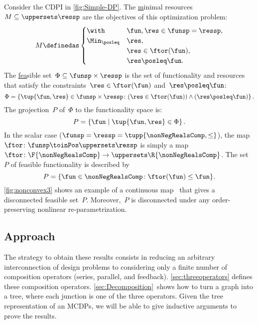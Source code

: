 \begin{example}
    \label{exa:one}
    Consider the CDPI in \cref{fig:Simple-DP}.
    The \uline{m}inimal resources~$M\subseteq\uppersets \ressp$ are the objectives of this optimization problem:
    \begin{equation*}
        M\definedas\begin{cases}
                       \with & \fun,\res\in\funsp=\ressp,\\
                       \Min_{\posleq} & \res,\\
                       & \res\in\ftor(\fun),\\
                       & \res\posleq\fun.
        \end{cases}
    \end{equation*}
    The \uline{fea}sible %
    set~$\Phi\subseteq\funsp\times\ressp$ is
    the set of functionality and resources that satisfy the constraints~$\res\in\ftor(\fun)$
    and~$\res\posleq\fun$:
    \begin{equation}
        \Phi=\left\{ \tup{\fun,\res}\in\funsp\times\ressp\colon (\res\in\ftor(\fun))\wedge(\res\posleq\fun)\right\} .\label{eq:feasible}
    \end{equation}
    The \uline{p}rojection~$P$ of~$\Phi$ to the functionality space
    is:
    \begin{equation*}
        P=\left\{ \fun\mid\tup{\fun,\res} \in\Phi\right\}.
    \end{equation*}
    In the scalar case ($\funsp=\ressp=\tupp{\nonNegRealsComp,\leq}$),
    the map~$\ftor\colon\funsp\toinPos\uppersets \ressp$ is simply a map~$\ftor\colon\F{\nonNegRealsComp}\to \uppersets\R{\nonNegRealsComp}$.
    The set~$P$ of feasible functionality is described by
    \begin{equation}
        P=\{\fun\in\nonNegRealsComp\colon \ftor(\fun)\leq\fun\}.\label{eq:Pfeasible}
    \end{equation}
    \cref{fig:nonconvex3} shows an example of a continuous map~\ftor
    that gives a disconnected feasible set~$P$. Moreover,~$P$ is disconnected
    under any order-preserving nonlinear re-parametrization.

\end{example}

\subsection{Approach}

The strategy to obtain these results  consists in reducing an arbitrary
interconnection of design problems to considering only a finite
number of composition operators (series, parallel, and feedback).
\cref{sec:threeoperators} defines these composition operators. \cref{sec:Decomposition}~shows
how to turn a graph into a tree, where each junction is one of the
three operators. Given the tree representation of an MCDPs, we will
be able to give inductive arguments to prove the results.

